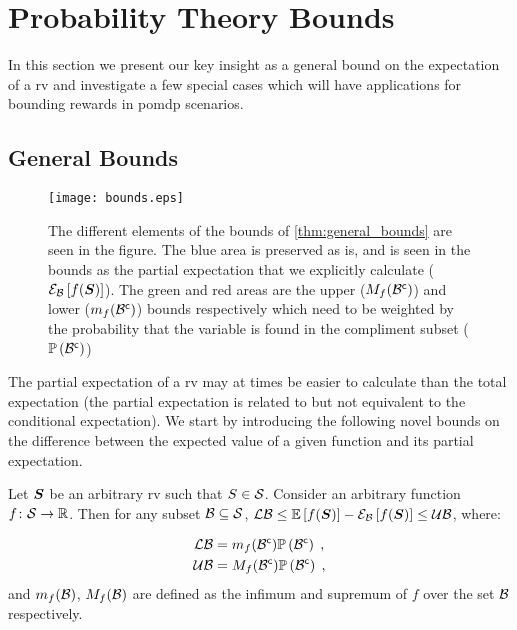 \chapter{Probability Theory Bounds}\label{sec:bounds}

In this section we present our key insight as a general bound on the expectation of a \gls{rv} and investigate a few special cases which will have applications for bounding rewards in \gls{pomdp} scenarios.


\section{General Bounds}\label{sec:general_bounds}
\begin{figure}[h]
	\centering
	\texttt{[image: bounds.eps]}
	\caption{The different elements of the bounds of \cref{thm:general_bounds} are seen in the figure. The blue area is preserved as is, and is seen in the bounds as the partial expectation that we explicitly calculate ($\mathcal{E}_{\mathcal B}\left[{f(\boldsymbol S)}\right]$). The green and red areas are the upper ($M_f({\mathcal B}^{\mathsf{c}})$) and lower ($m_f({\mathcal B}^{\mathsf{c}})$) bounds respectively which need to be weighted by the probability that the variable is found in the compliment subset ($\mathbb{P}\left({{\mathcal B}^{\mathsf{c}}}\right)$)}
	\label{fig:general_bounds}
\end{figure}
The partial expectation of a \gls{rv} may at times be easier to calculate than the total expectation (the partial expectation is related to but not equivalent to the conditional expectation). We start by introducing the following novel bounds on the difference between the expected value of a given function and its partial expectation.

\begin{theorem}
	\label{thm:general_bounds}
	Let $\boldsymbol S$ be an arbitrary \gls{rv} such that $S\in\mathcal S$. Consider an arbitrary function  $f\colon\mathcal S\to\mathbb{R}$. Then for any subset $\mathcal B\subseteq\mathcal S$, $\operatorname*{\mathcal{LB}}\leq\operatorname*{\mathbb{E}}\limits_{}\left[{f(\boldsymbol S)}\right]-\mathcal{E}_{\mathcal B}\left[{f(\boldsymbol S)}\right]\leq\operatorname*{\mathcal{UB}}$, where:
	\begin{subequations}
	\begin{align}
		\operatorname*{\mathcal{LB}} & = m_f({\mathcal B}^{\mathsf{c}})\mathbb{P}\left({{\mathcal B}^{\mathsf{c}}}\right)\;,\label{eq:bound_lower}
		\\
		\operatorname*{\mathcal{UB}} & = M_f({\mathcal B}^{\mathsf{c}})\mathbb{P}\left({{\mathcal B}^{\mathsf{c}}}\right)\;,\label{eq:bound_upper}
	\end{align}
	\end{subequations}
	and $m_f(\mathcal B)$, $M_f(\mathcal B)$ are defined as the infimum and supremum of $f$ over the set $\mathcal B$ respectively.
\end{theorem}

